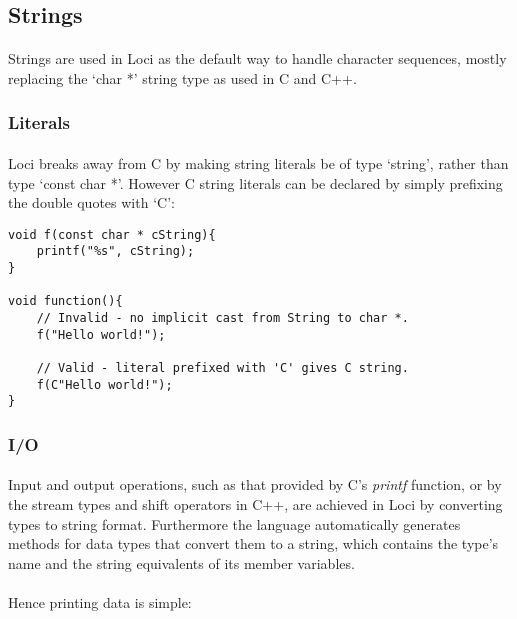 \documentclass[12pt,twoside,notitlepage]{report}
\begin{document}
\subsection{Strings}

\paragraph{}
Strings are used in Loci as the default way to handle character sequences, mostly replacing the `char *' string type as used in C and C++.

\subsubsection{Literals}

\paragraph{}
Loci breaks away from C by making string literals be of type `string', rather than type `const char *'. However C string literals can be declared by simply prefixing the double quotes with `C':


\begin{lstlisting}
void f(const char * cString){
	printf("%s", cString);
}

void function(){
	// Invalid - no implicit cast from String to char *.
	f("Hello world!");
	
	// Valid - literal prefixed with 'C' gives C string.
	f(C"Hello world!");
}
\end{lstlisting}


\subsubsection{I/O}

\paragraph{}
Input and output operations, such as that provided by C's \emph{printf} function, or by the stream types and shift operators in C++, are achieved in Loci by converting types to string format. Furthermore the language automatically generates methods for data types that convert them to a string, which contains the type's name and the string equivalents of its member variables.

\paragraph{}
Hence printing data is simple:
\end{document}
